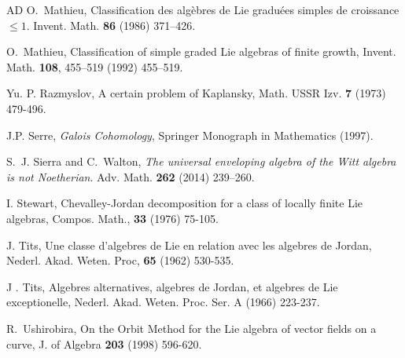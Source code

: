 \documentclass[11pt, letterpaper, reqno]{amsart}
\theoremstyle{definition}
\begin{document}
\begin{thebibliography}{AD}
 O.~Mathieu,
Classification des algèbres de Lie graduées simples de croissance $\leq1$. 
Invent. Math. \textbf{86} (1986)  371--426.

 O.~Mathieu,
Classification of simple graded Lie algebras of finite growth,
Invent. Math. \textbf{108}, 455--519 (1992)  455--519.

 Yu. P. Razmyslov, A certain problem of Kaplansky,  Math. USSR Izv. {\bf 7}
(1973) 479-496.

 J.P. Serre, {\it Galois Cohomology},
Springer Monograph in Mathematics (1997).


S.~J. Sierra and C.~Walton, \emph{The universal enveloping algebra of the {W}itt
algebra is not Noetherian}. Adv. Math. \textbf{262} (2014) 239--260.

I. Stewart, Chevalley-Jordan decomposition for a class of locally finite Lie  algebras, Compos. Math., {\bf 33} (1976) 75-105.
	
 J. Tits, Une classe d'algebres de Lie en relation avec les algebres de Jordan, Nederl. Akad.
Weten. Proc, \textbf{65} (1962) 530-535.

 J . Tits, Algebres alternatives, algebres de Jordan, et algebres de Lie exceptionelle, Nederl.
Akad. Weten. Proc. Ser. A (1966) 223-237.



 R.~Ushirobira, On the Orbit Method for the Lie
algebra of vector fields on a curve, 
J. of Algebra {\bf 203} (1998) 596-620.
\end{thebibliography}
\end{document}
